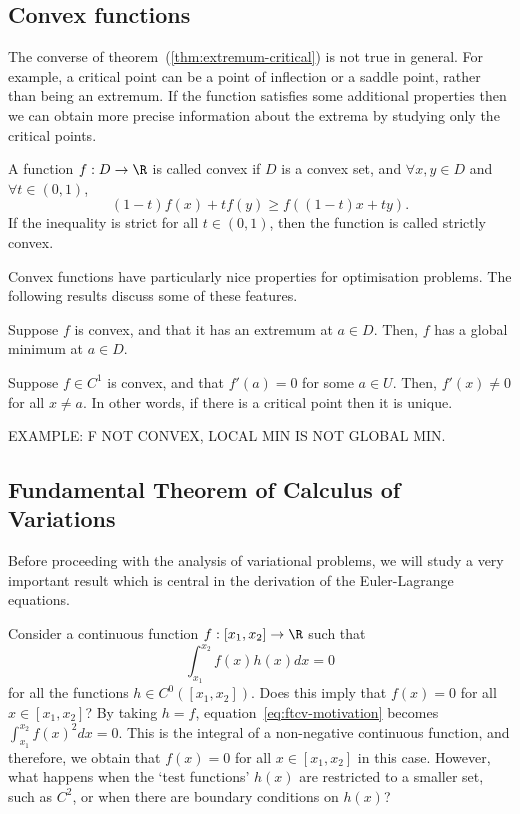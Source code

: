 \subsection{Convex functions}
The converse of theorem~(\ref{thm:extremum-critical}) is not true in general. For example, a critical point can be a point of inflection or a saddle point, rather than being an extremum. If the function satisfies some additional properties then we can obtain more precise information about the extrema by studying only the critical points.
\begin{ndfn}
  A function $f:D \to \R$ is called convex if $D$ is a convex set, and $\forall x, y \in D$ and $\forall t \in (0,1)$,
  \begin{equation}
    (1-t) f(x) + t f(y) \geq f\left((1-t)x + ty\right).
  \end{equation}
  If the inequality is strict for all $t \in (0,1)$, then the function is called strictly convex.
\end{ndfn}
Convex functions have particularly nice properties for optimisation problems. The following results discuss some of these features.
\begin{nprop}
  Suppose $f$ is convex, and that it has an extremum at $a \in D$. Then, $f$ has a global minimum at $a \in D$.
\end{nprop}
\begin{nprop}
  Suppose $f \in C^{1}$ is convex, and that $f'(a)=0$ for some $a \in U$. Then, $f'(x) \neq 0$ for all $x \neq a$. In other words, if there is a critical point then it is unique.
\end{nprop}

EXAMPLE: F NOT CONVEX, LOCAL MIN IS NOT GLOBAL MIN.


\subsection{Fundamental Theorem of Calculus of Variations}
Before proceeding with the analysis of variational problems, we will study a very important result which is central in the derivation of the Euler-Lagrange equations.

Consider a continuous function $f : [x_1, x_2] \to \R$ such that
\begin{equation}
  \label{eq:ftcv-motivation}
  \int_{x_1}^{x_2} f(x) h(x) dx = 0
\end{equation}
for all the functions $h \in C^{0}([x_1, x_2])$. Does this imply that $f(x)=0$ for all $x \in [x_1, x_2]$? By taking $h = f$, equation~\eqref{eq:ftcv-motivation} becomes $\int_{x_1}^{x_2} f(x)^2 dx = 0$. This is the integral of a non-negative continuous function, and therefore, we obtain that $f(x)=0$ for all $x \in [x_1, x_2]$ in this case. However, what happens when the `test functions' $h(x)$ are restricted to a smaller set, such as $C^{2}$, or when there are boundary conditions on $h(x)$?

